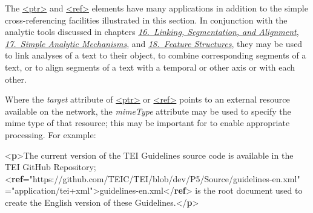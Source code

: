 The \hyperref[TEI.ptr]{<ptr>} and \hyperref[TEI.ref]{<ref>} elements have many applications in addition to the simple cross-referencing facilities illustrated in this section. In conjunction with the analytic tools discussed in chapters \textit{\hyperref[SA]{16.\ Linking, Segmentation, and Alignment}}, \textit{\hyperref[AI]{17.\ Simple Analytic Mechanisms}}, and \textit{\hyperref[FS]{18.\ Feature Structures}}, they may be used to link analyses of a text to their object, to combine corresponding segments of a text, or to align segments of a text with a temporal or other axis or with each other.\par
Where the {\itshape target} attribute of \hyperref[TEI.ptr]{<ptr>} or \hyperref[TEI.ref]{<ref>} points to an external resource available on the network, the {\itshape mimeType} attribute may be used to specify the mime type of that resource; this may be important for to enable appropriate processing. For example: \par\bgroup{}\exampleFont \begin{shaded}\noindent\mbox{}{<\textbf{p}>}The current version of the TEI Guidelines source code\mbox{}\newline 
 is available in the TEI GitHub Repository; {<\textbf{ref}\hspace*{1em}{target}="{https://github.com/TEIC/TEI/blob/dev/P5/Source/guidelines-en.xml}"\mbox{}\newline 
\hspace*{1em}\hspace*{1em}{mimeType}="{application/tei+xml}">}guidelines-en.xml{</\textbf{ref}>} \mbox{}\newline 
 is the root document used to create the English version\mbox{}\newline 
 of these Guidelines.{</\textbf{p}>}\end{shaded}\egroup\par 
